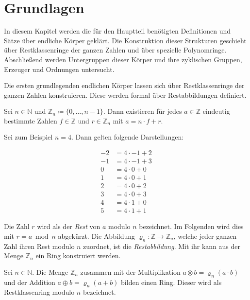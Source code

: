 \section{Grundlagen} \label{sec:grundlagen}

In diesem Kapitel werden die für den Hauptteil benötigten Definitionen und Sätze über endliche Körper geklärt. Die Konstruktion dieser Strukturen geschieht über Restklassenringe der ganzen Zahlen und über spezielle Polynomringe. Abschließend werden Untergruppen dieser Körper und ihre zyklischen Gruppen, Erzeuger und Ordnungen untersucht.

Die ersten grundlegenden endlichen Körper lassen sich über Restklassenringe der ganzen Zahlen konstruieren. Diese werden formal über Restabbildungen definiert.

\begin{satz}
    Sei $n \in \mathbb{N}$ und $\mathbb{Z}_n \coloneqq \{0,\dots,n-1\}$. Dann existieren für jedes $a \in \mathbb{Z}$ eindeutig bestimmte Zahlen $f \in \mathbb{Z}$ und $r \in \mathbb{Z}_n$ mit $a = n \cdot f + r$.
\end{satz}

Sei zum Beispiel $n = 4$. Dann gelten folgende Darstellungen:

\begin{align*}
    -2 &= 4 \cdot -1 + 2 \\
    -1 &= 4 \cdot -1 + 3 \\
    0 &= 4 \cdot 0 + 0 \\
    1 &= 4 \cdot 0 + 1 \\
    2 &= 4 \cdot 0 + 2 \\
    3 &= 4 \cdot 0 + 3 \\
    4 &= 4 \cdot 1 + 0 \\
    5 &= 4 \cdot 1 + 1
\end{align*}

Die Zahl $r$ wird als der \emph{Rest} von $a$ modulo $n$ bezeichnet. Im Folgenden wird dies mit $r = a \bmod n$ abgekürzt. Die Abbildung $\varrho_n : \mathbb{Z} \rightarrow \mathbb{Z}_n$, welche jeder ganzen Zahl ihren Rest modulo $n$ zuordnet, ist die \emph{Restabbildung}. Mit ihr kann aus der Menge $\mathbb{Z}_n$ ein Ring konstruiert werden.

\begin{satz}
    Sei $n \in \mathbb{N}$. Die Menge $\mathbb{Z}_n$ zusammen mit der Multiplikation $a \otimes b = \varrho_n(a \cdot b)$ und der Addition $a \oplus b = \varrho_n(a + b)$ bilden einen Ring. Dieser wird als Restklassenring modulo $n$ bezeichnet.
\end{satz}

